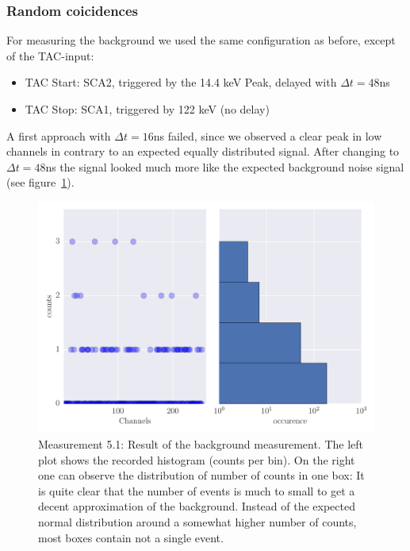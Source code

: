\subsubsection{Random coicidences}
\label{ssub:Random coicidences}
For measuring the background we used the same configuration as before, except of the TAC-input:
\begin{itemize}
    \item TAC Start: SCA2, triggered by the 14.4 keV Peak, delayed with $\Delta t = 48$ns
    \item TAC Stop: SCA1, triggered by 122 keV (no delay)
\end{itemize}
A first approach with $\Delta t = 16$ns failed, since we observed a clear peak in low channels in contrary
to an expected equally distributed signal. After changing to $\Delta t=48$ns the signal looked much more 
like the expected background noise signal (see figure~\ref{fig:5_1}).
\begin{figure}[htpb]
    \centering
    \includegraphics[width=1.0\linewidth]{analysis/figures/plot5_1_hist}
    \caption{
        Measurement 5.1: Result of the background measurement. 
        The left plot shows the recorded histogram (counts per bin). 
        On the right one can observe the distribution of number of counts 
        in one box: It is quite clear that the number of events is much to small 
        to get a decent approximation of the background. Instead of the expected 
        normal distribution around a somewhat higher number of counts, most boxes 
        contain not a single event. 
        }
    \label{fig:5_1}
\end{figure}

\clearpage

